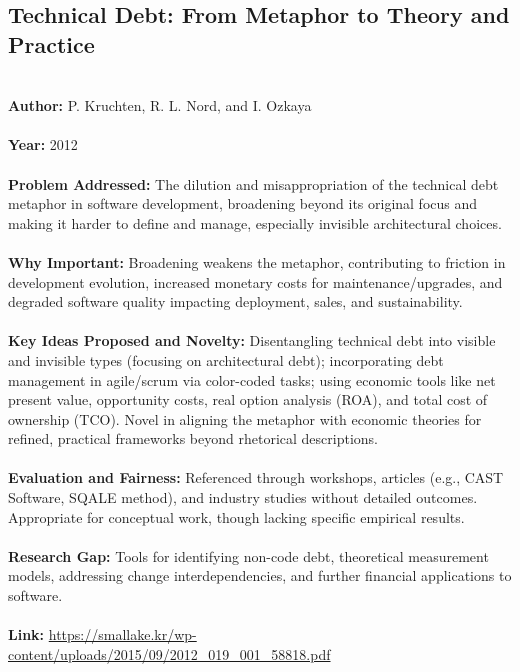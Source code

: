 \documentclass[12pt]{article}
\begin{document}
\subsection*{Technical Debt: From Metaphor to Theory and Practice}
\\
\textbf{Author:} P. Kruchten, R. L. Nord, and I. Ozkaya \\
\\
\textbf{Year:} 2012 \\
\\
\textbf{Problem Addressed:} The dilution and misappropriation of the technical debt metaphor in software development, broadening beyond its original focus and making it harder to define and manage, especially invisible architectural choices. \\
\\
\textbf{Why Important:} Broadening weakens the metaphor, contributing to friction in development evolution, increased monetary costs for maintenance/upgrades, and degraded software quality impacting deployment, sales, and sustainability. \\
\\
\textbf{Key Ideas Proposed and Novelty:} Disentangling technical debt into visible and invisible types (focusing on architectural debt); incorporating debt management in agile/scrum via color-coded tasks; using economic tools like net present value, opportunity costs, real option analysis (ROA), and total cost of ownership (TCO). Novel in aligning the metaphor with economic theories for refined, practical frameworks beyond rhetorical descriptions. \\
\\
\textbf{Evaluation and Fairness:} Referenced through workshops, articles (e.g., CAST Software, SQALE method), and industry studies without detailed outcomes. Appropriate for conceptual work, though lacking specific empirical results. \\
\\
\textbf{Research Gap:} Tools for identifying non-code debt, theoretical measurement models, addressing change interdependencies, and further financial applications to software. \\
\\
\textbf{Link:} \url{https://smallake.kr/wp-content/uploads/2015/09/2012_019_001_58818.pdf}
\pagebreak

\end{document}
